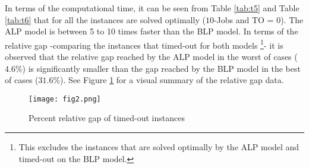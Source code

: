 \begin{table}[h!] \small
\renewcommand{\arraystretch}{1.4} %
\caption{Group 4 - 5 to 8 jobs per customer on ALP model (60 instances)}
\label{tab:t8}
\end{table} 

In terms of the computational time, it can be seen from Table \ref{tab:t5} and  Table \ref{tab:t6} that for all the instances are solved optimally ($10$-Jobs and TO = 0). The ALP model is between 5 to 10 times faster than the BLP model. In terms of the relative gap -comparing the instances that timed-out for both models \footnote{This excludes the instances that are solved optimally by the ALP model and timed-out on the BLP model.}- it is observed that the relative gap reached by the ALP model in the worst of cases ($4.6\%$) is significantly smaller than the gap reached by the BLP model in the best of cases ($31.6\%$). See Figure \ref{fig:f2} for a visual summary of the relative gap data.
\begin{figure}[h!]
\caption{Percent relative gap of timed-out instances}
\label{fig:f2}
\centering
\texttt{[image: fig2.png]}
\end{figure}







